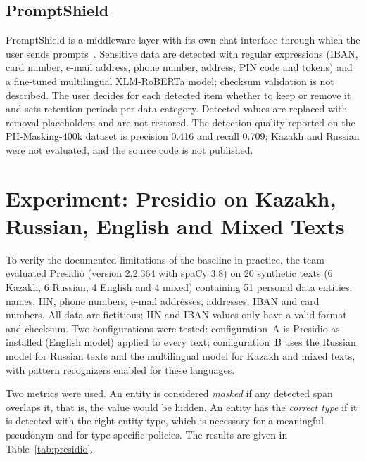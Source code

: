 \documentclass[12pt,a4paper]{article}
\begin{document}
\subsection{PromptShield}

PromptShield is a middleware layer with its own chat interface through which the user sends prompts~\cite{promptshield}. Sensitive data are detected with regular expressions (IBAN, card number, e-mail address, phone number, address, PIN code and tokens) and a fine-tuned multilingual XLM-RoBERTa model; checksum validation is not described. The user decides for each detected item whether to keep or remove it and sets retention periods per data category. Detected values are replaced with removal placeholders and are not restored. The detection quality reported on the PII-Masking-400k dataset is precision 0.416 and recall 0.709; Kazakh and Russian were not evaluated, and the source code is not published.

\section{Experiment: Presidio on Kazakh, Russian, English and Mixed Texts}\label{sec:experiment}

To verify the documented limitations of the baseline in practice, the team evaluated Presidio (version 2.2.364 with spaCy 3.8) on 20 synthetic texts (6 Kazakh, 6 Russian, 4 English and 4 mixed) containing 51 personal data entities: names, IIN, phone numbers, e-mail addresses, addresses, IBAN and card numbers. All data are fictitious; IIN and IBAN values only have a valid format and checksum. Two configurations were tested: configuration~A is Presidio as installed (English model) applied to every text; configuration~B uses the Russian model for Russian texts and the multilingual model for Kazakh and mixed texts, with pattern recognizers enabled for these languages.

Two metrics were used. An entity is considered \emph{masked} if any detected span overlaps it, that is, the value would be hidden. An entity has the \emph{correct type} if it is detected with the right entity type, which is necessary for a meaningful pseudonym and for type-specific policies. The results are given in Table~\ref{tab:presidio}.
\end{document}

